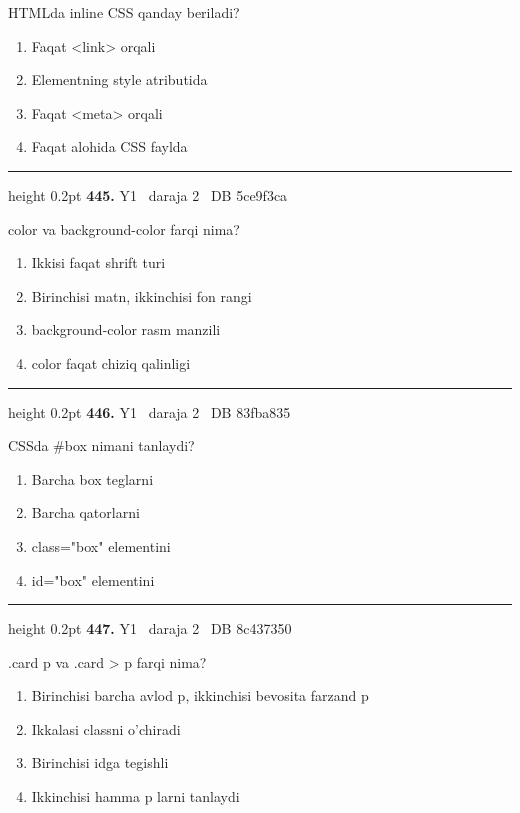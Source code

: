 \documentclass[10pt,a4paper,oneside]{article}
\begin{document}
\par
HTMLda inline CSS qanday beriladi?
\begin{enumerate}[label=\Alph*),leftmargin=9mm]
\item Faqat \textless{}link\textgreater{} orqali
\item Elementning style atributida
\item Faqat \textless{}meta\textgreater{} orqali
\item Faqat alohida CSS faylda
\end{enumerate}
\vspace{2mm}\hrule height 0.2pt \vspace{4mm}
\hypertarget{q445}{\textbf{\color{ink}445.}}  {\color{muted}\scriptsize Y1 \textbullet\ daraja 2 \textbullet\ DB 5ce9f3ca}
\par
color va background-color farqi nima?
\begin{enumerate}[label=\Alph*),leftmargin=9mm]
\item Ikkisi faqat shrift turi
\item Birinchisi matn, ikkinchisi fon rangi
\item background-color rasm manzili
\item color faqat chiziq qalinligi
\end{enumerate}
\vspace{2mm}\hrule height 0.2pt \vspace{4mm}
\hypertarget{q446}{\textbf{\color{ink}446.}}  {\color{muted}\scriptsize Y1 \textbullet\ daraja 2 \textbullet\ DB 83fba835}
\par
CSSda \#box nimani tanlaydi?
\begin{enumerate}[label=\Alph*),leftmargin=9mm]
\item Barcha box teglarni
\item Barcha qatorlarni
\item class="box" elementini
\item id="box" elementini
\end{enumerate}
\vspace{2mm}\hrule height 0.2pt \vspace{4mm}
\hypertarget{q447}{\textbf{\color{ink}447.}}  {\color{muted}\scriptsize Y1 \textbullet\ daraja 2 \textbullet\ DB 8c437350}
\par
.card p va .card \textgreater{} p farqi nima?
\begin{enumerate}[label=\Alph*),leftmargin=9mm]
\item Birinchisi barcha avlod p, ikkinchisi bevosita farzand p
\item Ikkalasi classni o'chiradi
\item Birinchisi idga tegishli
\item Ikkinchisi hamma p larni tanlaydi
\end{enumerate}
\end{document}
